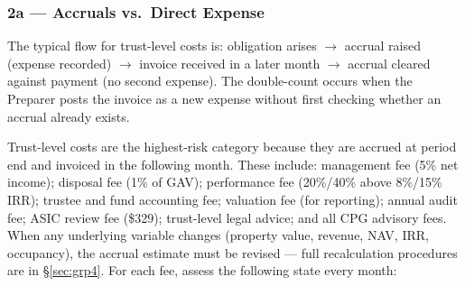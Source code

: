 \documentclass[10pt,a4paper]{article}
\begin{document}
\subsubsection{2a --- Accruals vs.\ Direct Expense}
\label{sec:grp2a}

The typical flow for trust-level costs is: obligation arises $\to$ accrual raised (expense recorded) $\to$ invoice received in a later month $\to$ accrual cleared against payment (no second expense). The double-count occurs when the Preparer posts the invoice as a new expense without first checking whether an accrual already exists.

Trust-level costs are the highest-risk category because they are accrued at period end and invoiced in the following month. These include: management fee (5\% net income); disposal fee (1\% of GAV); performance fee (20\%/40\% above 8\%/15\% IRR); trustee and fund accounting fee; valuation fee (for reporting); annual audit fee; ASIC review fee (\$329); trust-level legal advice; and all CPG advisory fees. When any underlying variable changes (property value, revenue, NAV, IRR, occupancy), the accrual estimate must be revised --- full recalculation procedures are in \S\ref{sec:grp4}. For each fee, assess the following state every month:
\end{document}
